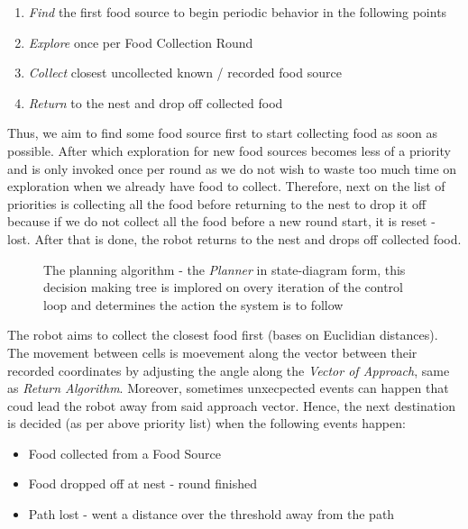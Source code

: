 \documentclass[11pt, a4paper]{article}
\begin{document}
\begin{enumerate}
	\item \textit{Find} the first food source to begin periodic behavior in the following points
	\item \textit{Explore} once per Food Collection Round
	\item \textit{Collect} closest uncollected known / recorded food source
	\item \textit{Return} to the nest and drop off collected food
\end{enumerate}

Thus, we aim to find some food source first to start collecting food as soon as possible. After which exploration for new food sources becomes less of a priority and is only invoked once per round as we do not wish to waste too much time on exploration when we already have food to collect. Therefore, next on the list of priorities is collecting all the food before returning to the nest to drop it off because if we do not collect all the food before a new round start, it is reset - lost. After that is done, the robot returns to the nest and drops off collected food.


\begin{figure}[H]
	  \caption{The planning algorithm - the \textit{Planner} in state-diagram form, this decision making tree is implored on overy iteration of the control loop and determines the action the system is to follow}
\end{figure} 

The robot aims to collect the closest food first (bases on Euclidian distances). The movement between cells is moevement along the vector between their recorded coordinates by adjusting the angle along the \textit{Vector of Approach}, same as \textit{Return Algorithm}\cite{task2_report}. Moreover, sometimes unxecpected events can happen that coud lead the robot away from said approach vector. Hence, the next destination is decided (as per above priority list) when the following events happen:

\begin{itemize}

	\item Food collected from a Food Source
	\item Food dropped off at nest - round finished
	\item Path lost - went a distance over the threshold away from the path

\end{itemize}
\end{document}
